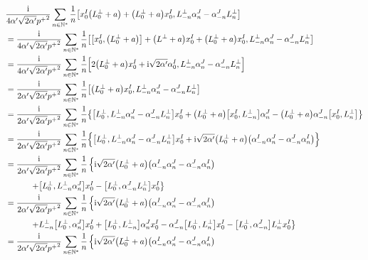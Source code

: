 \begin{align*}
    &\frac{\im}{4\alpha'\sqrt{2\alpha'}{p^+}^2}\sum\limits_{n\in\mathbb N^\ast}\frac1n\comm{x_0^I\qty(L_0^\perp+a)+\qty(L_0^\perp+a)x_0^I}{L^\perp_{-n}\alpha_n^J-\alpha^J_{-n}L^\perp_n}\\
    &=\frac{\im}{4\alpha'\sqrt{2\alpha'}{p^+}^2}\sum\limits_{n\in\mathbb N^\ast}\frac1n\comm{\comm{x_0^I}{\qty(L_0^\perp+a)}+\qty(L^\perp+a)x_0^I+\qty(L_0^\perp+a)x_0^I}{L^\perp_{-n}\alpha_n^J-\alpha^J_{-n}L^\perp_n}\\
    &=\frac{\im}{4\alpha'\sqrt{2\alpha'}{p^+}^2}\sum\limits_{n\in\mathbb N^\ast}\frac1n\comm{2\qty(L_0^\perp+a)x_0^I+\im\sqrt{2\alpha'} \alpha_0^I}{L^\perp_{-n}\alpha_n^J-\alpha^J_{-n}L^\perp_n}\\
    &=\frac{\im}{2\alpha'\sqrt{2\alpha'}{p^+}^2}\sum\limits_{n\in\mathbb N^\ast}\frac1n\comm{\qty(L_0^\perp+a)x_0^I}{L^\perp_{-n}\alpha_n^J-\alpha^J_{-n}L^\perp_n}\\
    &=\frac{\im}{2\alpha'\sqrt{2\alpha'}{p^+}^2}\sum\limits_{n\in\mathbb N^\ast}\frac1n\qty{\comm{L_0^\perp}{L^\perp_{-n}\alpha_n^J-\alpha^J_{-n}L^\perp_n}x_0^I+\qty(L_0^\perp+a)\comm{x_0^I}{L^\perp_{-n}}\alpha_n^J-\qty(L_0^\perp+a)\alpha^J_{-n}\comm{x_0^I}{L^\perp_n}}\\
    &=\frac{\im}{2\alpha'\sqrt{2\alpha'}{p^+}^2}\sum\limits_{n\in\mathbb N^\ast}\frac1n\qty{\comm{L_0^\perp}{L^\perp_{-n}\alpha_n^J-\alpha^J_{-n}L^\perp_n}x_0^I+\im\sqrt{2\alpha'}\qty(L_0^\perp+a)\qty(\alpha_{-n}^I\alpha_n^J-\alpha^J_{-n}\alpha_n^I)}\\
    &=\frac{\im}{2\alpha'\sqrt{2\alpha'}{p^+}^2}\sum\limits_{n\in\mathbb N^\ast}\frac1n\left\{\im\sqrt{2\alpha'}\qty(L_0^\perp+a)\qty(\alpha_{-n}^I\alpha_n^J-\alpha^J_{-n}\alpha_n^I)\right.\\
    &\quad\quad\quad\left.+\comm{L_0^\perp}{L^\perp_{-n}\alpha_n^J}x_0^I-\comm{L_0^\perp}{\alpha^J_{-n}L^\perp_n}x_0^I\right\}\\
    &=\frac{\im}{2\alpha'\sqrt{2\alpha'}{p^+}^2}\sum\limits_{n\in\mathbb N^\ast}\frac1n\left\{\im\sqrt{2\alpha'}\qty(L_0^\perp+a)\qty(\alpha_{-n}^I\alpha_n^J-\alpha^J_{-n}\alpha_n^I)\right.\\
    &\quad\quad\quad\left.+L^\perp_{-n}\comm{L_0^\perp}{\alpha_n^J}x_0^I+\comm{L_0^\perp}{L^\perp_{-n}}\alpha_n^Jx_0^I-\alpha^J_{-n}\comm{L_0^\perp}{L^\perp_n}x_0^I-\comm{L_0^\perp}{\alpha^J_{-n}}L^\perp_nx_0^I\right\}\\
    &=\frac{\im}{2\alpha'\sqrt{2\alpha'}{p^+}^2}\sum\limits_{n\in\mathbb N^\ast}\frac1n\left\{\im\sqrt{2\alpha'}\qty(L_0^\perp+a)\qty(\alpha_{-n}^I\alpha_n^J-\alpha^J_{-n}\alpha_n^I)\right.\\

\end{align*}
